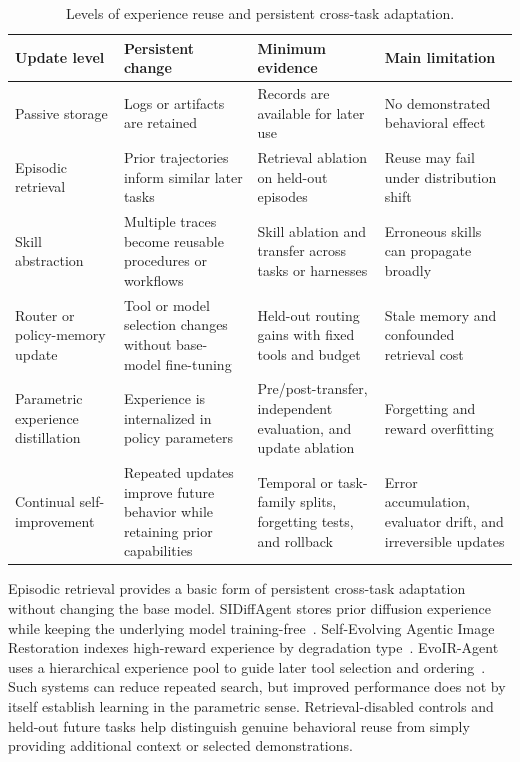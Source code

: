 \begin{table}[t]
  \caption{Levels of experience reuse and persistent cross-task adaptation.}
  \label{tab:experience-reuse}
  \small
  \begin{tabularx}{\textwidth}{@{}p{}XXX@{}}
    \toprule
    Update level & Persistent change & Minimum evidence & Main limitation \\
    \midrule
    Passive storage & Logs or artifacts are retained & Records are available for later use & No demonstrated behavioral effect \\
    Episodic retrieval & Prior trajectories inform similar later tasks & Retrieval ablation on held-out episodes & Reuse may fail under distribution shift \\
    Skill abstraction & Multiple traces become reusable procedures or workflows & Skill ablation and transfer across tasks or harnesses & Erroneous skills can propagate broadly \\
    Router or policy-memory update & Tool or model selection changes without base-model fine-tuning & Held-out routing gains with fixed tools and budget & Stale memory and confounded retrieval cost \\
    Parametric experience distillation & Experience is internalized in policy parameters & Pre/post-transfer, independent evaluation, and update ablation & Forgetting and reward overfitting \\
    Continual self-improvement & Repeated updates improve future behavior while retaining prior capabilities & Temporal or task-family splits, forgetting tests, and rollback & Error accumulation, evaluator drift, and irreversible updates \\
    \bottomrule
  \end{tabularx}
\end{table}
\FloatBarrier

Episodic retrieval provides a basic form of persistent cross-task adaptation without changing the base model. SIDiffAgent stores prior diffusion experience while keeping the underlying model training-free~\cite{avg260202051}. Self-Evolving Agentic Image Restoration indexes high-reward experience by degradation type~\cite{avg260628971}. EvoIR-Agent uses a hierarchical experience pool to guide later tool selection and ordering~\cite{avg260522208}. Such systems can reduce repeated search, but improved performance does not by itself establish learning in the parametric sense. Retrieval-disabled controls and held-out future tasks help distinguish genuine behavioral reuse from simply providing additional context or selected demonstrations.

